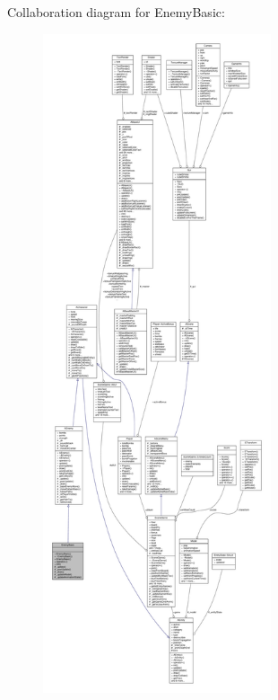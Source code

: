 Collaboration diagram for Enemy\+Basic\+:
\nopagebreak
\begin{figure}[H]
\begin{center}
\leavevmode
\includegraphics[height=550pt]{class_enemy_basic__coll__graph}
\end{center}
\end{figure}
